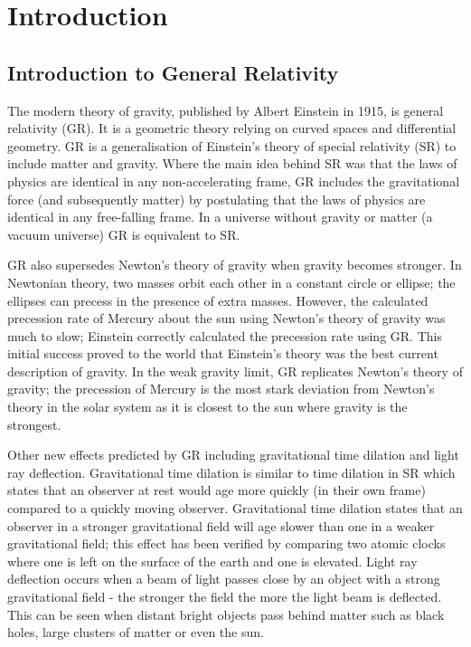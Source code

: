

\section{Introduction}
\subsection{Introduction to General Relativity}

The modern theory of gravity, published by Albert Einstein in 1915, is general relativity (GR). It is a geometric theory relying on curved spaces and differential geometry. GR is a generalisation of Einstein's theory of special relativity (SR) to include matter and gravity. Where the main idea behind SR was that the laws of physics are identical in any non-accelerating frame, GR includes the gravitational force (and subsequently matter) by postulating that the laws of physics are identical in any free-falling frame. In a universe without gravity or matter (a vacuum universe) GR is equivalent to SR.

GR also supersedes Newton's theory of gravity when gravity becomes stronger. In Newtonian theory, two masses orbit each other in a constant circle or ellipse; the ellipses can precess in the presence of extra masses. However, the calculated precession rate of Mercury about the sun using Newton's theory of gravity was much to slow; Einstein correctly calculated the precession rate using GR. This initial success proved to the world that Einstein's theory was the best current description of gravity. In the weak gravity limit, GR replicates Newton's theory of gravity; the precession of Mercury is the most stark deviation from Newton's theory in the solar system as it is closest to the sun where gravity is the strongest. 

Other new effects predicted by GR including gravitational time dilation and light ray deflection. Gravitational time dilation is similar to time dilation in SR which states that an observer at rest would age more quickly (in their own frame) compared to a quickly moving observer. Gravitational time dilation states that an observer in a stronger gravitational field will age slower than one in a weaker gravitational field; this effect has been verified by comparing two atomic clocks where one is left on the surface of the earth and one is elevated. Light ray deflection occurs when a beam of light passes close by an object with a strong gravitational field - the stronger the field the more the light beam is deflected. This can be seen when distant bright objects pass behind matter such as black holes, large clusters of matter or even the sun.

